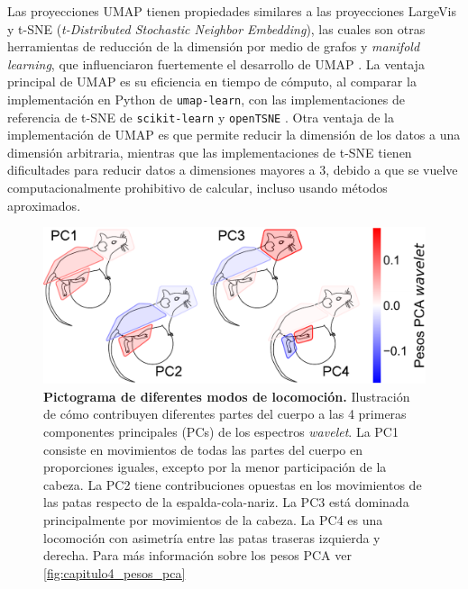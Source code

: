 Las proyecciones UMAP tienen propiedades similares a las proyecciones LargeVis y t-SNE (\textit{t-Distributed Stochastic Neighbor Embedding}), las cuales son otras herramientas de reducción de la dimensión por medio de grafos y \textit{manifold learning}, que influenciaron fuertemente el desarrollo de UMAP \cite{large_vis, vdm_tsne, kobak_art, kobak_umap_tsne}. La ventaja principal de UMAP es su eficiencia en tiempo de cómputo, al comparar la implementación en Python de \texttt{umap-learn}, con las implementaciones de referencia de t-SNE de \texttt{scikit-learn} y \texttt{openTSNE} \cite{scikit-learn, policar_tsne}. Otra ventaja de la implementación de UMAP es que permite reducir la dimensión de los datos a una dimensión arbitraria, mientras que las implementaciones de t-SNE tienen dificultades para reducir datos a dimensiones mayores a 3, debido a que se vuelve computacionalmente prohibitivo de calcular, incluso usando métodos aproximados.

\begin{figure}[htbp]
    \centering
    \includegraphics[width=0.8\linewidth]{figuras/capitulo4/partes_del_cuerpo_pca.pdf}
    \caption{\textbf{Pictograma de diferentes modos de locomoción.}
        Ilustración de cómo contribuyen diferentes partes del cuerpo a las 4 primeras componentes principales (PCs) de los espectros \textit{wavelet}. La PC1 consiste en movimientos de todas las partes del cuerpo en proporciones iguales, excepto por la menor participación de la cabeza. La PC2 tiene contribuciones opuestas en los movimientos de las patas respecto de la espalda-cola-nariz. La PC3 está dominada principalmente por movimientos de la cabeza. La PC4 es una locomoción con asimetría entre las patas traseras izquierda y derecha. Para más información sobre los pesos PCA ver \autoref{fig:capitulo4_pesos_pca}}
    \label{fig:capitulo4_partes_del_cuerpo_pca}
\end{figure}

